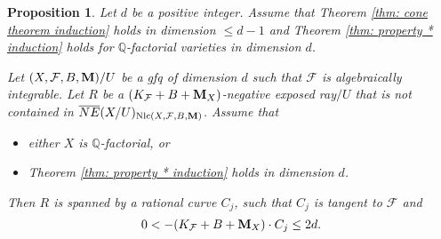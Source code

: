 \documentclass[11pt]{amsart}
\numberwithin{equation}{section}
\newcommand{\Mm}{{\bf{M}}}
\newcommand{\Qq}{\mathbb{Q}}
\newcommand{\Nlc}{\operatorname{Nlc}}
\newcommand{\Ff}{\mathcal{F}}
\newtheorem{prop}[thm]{Proposition}
\theoremstyle{definition}
\theoremstyle{definition}
\theoremstyle{definition}
\begin{document}
\begin{prop}\label{prop: * to cone}
    Let $d$ be a positive integer. Assume that Theorem \ref{thm: cone theorem induction} holds in dimension $\leq d-1$ and Theorem \ref{thm: property * induction} holds for $\Qq$-factorial varieties in dimension $d$. 

    Let $(X,\Ff,B,\Mm)/U$ be a gfq of dimension $d$ such that $\Ff$ is algebraically integrable. Let $R$ be a $(K_{\Ff}+B+\Mm_X)$-negative exposed ray$/U$ that is not contained in $\overline{NE}(X/U)_{\Nlc(X,\Ff,B,\Mm)}$. Assume that
    \begin{itemize}
        \item either $X$ is $\Qq$-factorial, or
        \item Theorem \ref{thm: property * induction} holds in dimension $d$. 
    \end{itemize}
Then $R$ is spanned by a rational curve $C_j$, such that $C_j$ is tangent to $\Ff$ and $$0<-(K_{\Ff}+B+\Mm_X)\cdot C_j\leq 2d.$$
\end{prop}
\end{document}
